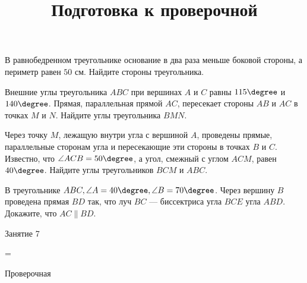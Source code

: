\begin{homework}[number=3]
	\begin{listofex}
		\item В равнобедренном треугольнике основание в два раза меньше боковой стороны, а периметр равен \(50\) см. Найдите стороны треугольника.
		\item Внешние углы треугольника \(ABC\) при вершинах \(A\) и \(C\) равны \(115\degree\) и \(140\degree \). Прямая, параллельная прямой \(AC\), пересекает стороны \(AB\) и \(AC\) в точках \(M\) и \(N\). Найдите углы треугольника \(BMN\).
		\item Через точку \(M\), лежащую внутри угла с вершиной \(A\), проведены прямые, параллельные сторонам угла и пересекающие эти стороны в точках \(B\) и \(C\). Известно, что \(\angle ACB = 50\degree\), а угол, смежный с углом \(ACM\), равен \(40\degree\). Найдите углы треугольников \(BCM\) и \(ABC\).
		\item В треугольнике \( ABC, \angle A = 40 \degree, \angle B = 70 \degree \). Через вершину \(B\) проведена прямая \(BD\) так, что луч \(BC\) --- биссектриса угла \(BCE\) угла \(ABD\). Докажите, что \(AC \parallel BD\).
	\end{listofex}
\end{homework}

\begin{class}[number=7]
	\title{Подготовка к проверочной}
	\begin{listofex}
		\item Занятие 7
	\end{listofex}
\end{class}

=%
\begin{exam}
	\begin{listofex}
		\item Проверочная
	\end{listofex}
\end{exam}
